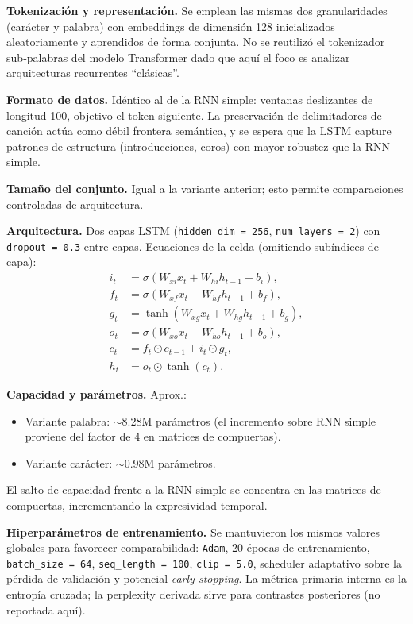 \documentclass[paper=letter, fontsize=11pt, draft=false]{scrartcl}
\numberwithin{equation}{section} %
\numberwithin{figure}{section} %
\numberwithin{table}{section} %
\numberwithin{subsection}{section}
\begin{document}
	\textbf{Tokenización y representación.} Se emplean las mismas dos granularidades (carácter y palabra) con embeddings de dimensión 128 inicializados aleatoriamente y aprendidos de forma conjunta. No se reutilizó el tokenizador sub‐palabras del modelo Transformer dado que aquí el foco es analizar arquitecturas recurrentes “clásicas”.

	\textbf{Formato de datos.} Idéntico al de la RNN simple: ventanas deslizantes de longitud 100, objetivo el token siguiente. La preservación de delimitadores de canción actúa como débil frontera semántica, y se espera que la LSTM capture patrones de estructura (introducciones, coros) con mayor robustez que la RNN simple.

	\textbf{Tamaño del conjunto.} Igual a la variante anterior; esto permite comparaciones controladas de arquitectura.

	\textbf{Arquitectura.} Dos capas LSTM (\texttt{hidden\_dim = 256}, \texttt{num\_layers = 2}) con \texttt{dropout = 0.3} entre capas. Ecuaciones de la celda (omitiendo subíndices de capa):
\[
\begin{aligned}
i_t &= \sigma(W_{xi} x_t + W_{hi} h_{t-1} + b_i),\\
f_t &= \sigma(W_{xf} x_t + W_{hf} h_{t-1} + b_f),\\
g_t &= \tanh(W_{xg} x_t + W_{hg} h_{t-1} + b_g),\\
o_t &= \sigma(W_{xo} x_t + W_{ho} h_{t-1} + b_o),\\
c_t &= f_t \odot c_{t-1} + i_t \odot g_t,\\
h_t &= o_t \odot \tanh(c_t).
\end{aligned}
\]

\textbf{Capacidad y parámetros.} Aprox.:
\begin{itemize}
    \item Variante palabra: $\sim 8.28$M parámetros (el incremento sobre RNN simple proviene del factor de 4 en matrices de compuertas).
    \item Variante carácter: $\sim 0.98$M parámetros.
\end{itemize}
El salto de capacidad frente a la RNN simple se concentra en las matrices de compuertas, incrementando la expresividad temporal.

\textbf{Hiperparámetros de entrenamiento.} Se mantuvieron los mismos valores globales para favorecer comparabilidad: \texttt{Adam}, 20 épocas de entrenamiento, \texttt{batch\_size = 64}, \texttt{seq\_length = 100}, \texttt{clip = 5.0}, scheduler adaptativo sobre la pérdida de validación y potencial \emph{early stopping}. La métrica primaria interna es la entropía cruzada; la perplexity derivada sirve para contrastes posteriores (no reportada aquí).
\end{document}
